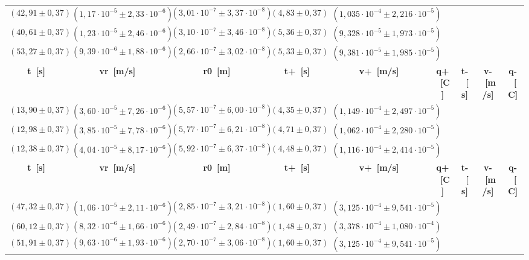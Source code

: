 \documentclass{article}
\begin{document}
\begin{table}[H]
\begin{flushleft}
\begin{tabular}{|c|c|c|c|c|c|c|c|c|}
        \midrule
        \((42,91 \pm 0,37)\) & \((1,17 \cdot 10^{-5} \pm 2,33 \cdot 10^{-6})\) & \((3,01 \cdot 10^{-7} \pm 3,37 \cdot 10^{-8})\) & \((4,83 \pm 0,37)\) & \((1,035 \cdot 10^{-4} \pm 2,216 \cdot 10^{-5})\) \\
        \((40,61 \pm 0,37)\) & \((1,23 \cdot 10^{-5} \pm 2,46 \cdot 10^{-6})\) & \((3,10 \cdot 10^{-7} \pm 3,46 \cdot 10^{-8})\) & \((5,36 \pm 0,37)\) & \((9,328 \cdot 10^{-5} \pm 1,973 \cdot 10^{-5})\) \\
        \((53,27 \pm 0,37)\) & \((9,39 \cdot 10^{-6} \pm 1,88 \cdot 10^{-6})\) & \((2,66 \cdot 10^{-7} \pm 3,02 \cdot 10^{-8})\) & \((5,33 \pm 0,37)\) & \((9,381 \cdot 10^{-5} \pm 1,985 \cdot 10^{-5})\) \\
        \toprule
        \textbf{t~[s]} & \textbf{vr~[m/s]} & \textbf{r0~[m]} & \textbf{t+~[s]} & \textbf{v+~[m/s]} & \textbf{q+~[C]} & \textbf{t-~[s]} & \textbf{v-~[m/s]} & \textbf{q-~[C]} \\
        \midrule
        \((13,90 \pm 0,37)\) & \((3,60 \cdot 10^{-5} \pm 7,26 \cdot 10^{-6})\) & \((5,57 \cdot 10^{-7} \pm 6,00 \cdot 10^{-8})\) & \((4,35 \pm 0,37)\) & \((1,149 \cdot 10^{-4} \pm 2,497 \cdot 10^{-5})\) \\
        \((12,98 \pm 0,37)\) & \((3,85 \cdot 10^{-5} \pm 7,78 \cdot 10^{-6})\) & \((5,77 \cdot 10^{-7} \pm 6,21 \cdot 10^{-8})\) & \((4,71 \pm 0,37)\) & \((1,062 \cdot 10^{-4} \pm 2,280 \cdot 10^{-5})\) \\
        \((12,38 \pm 0,37)\) & \((4,04 \cdot 10^{-5} \pm 8,17 \cdot 10^{-6})\) & \((5,92 \cdot 10^{-7} \pm 6,37 \cdot 10^{-8})\) & \((4,48 \pm 0,37)\) & \((1,116 \cdot 10^{-4} \pm 2,414 \cdot 10^{-5})\) \\
        \toprule
        \textbf{t~[s]} & \textbf{vr~[m/s]} & \textbf{r0~[m]} & \textbf{t+~[s]} & \textbf{v+~[m/s]} & \textbf{q+~[C]} & \textbf{t-~[s]} & \textbf{v-~[m/s]} & \textbf{q-~[C]} \\
        \midrule
        \((47,32 \pm 0,37)\) & \((1,06 \cdot 10^{-5} \pm 2,11 \cdot 10^{-6})\) & \((2,85 \cdot 10^{-7} \pm 3,21 \cdot 10^{-8})\) & \((1,60 \pm 0,37)\) & \((3,125 \cdot 10^{-4} \pm 9,541 \cdot 10^{-5})\) \\
        \((60,12 \pm 0,37)\) & \((8,32 \cdot 10^{-6} \pm 1,66 \cdot 10^{-6})\) & \((2,49 \cdot 10^{-7} \pm 2,84 \cdot 10^{-8})\) & \((1,48 \pm 0,37)\) & \((3,378 \cdot 10^{-4} \pm 1,080 \cdot 10^{-4})\) \\
        \((51,91 \pm 0,37)\) & \((9,63 \cdot 10^{-6} \pm 1,93 \cdot 10^{-6})\) & \((2,70 \cdot 10^{-7} \pm 3,06 \cdot 10^{-8})\) & \((1,60 \pm 0,37)\) & \((3,125 \cdot 10^{-4} \pm 9,541 \cdot 10^{-5})\) \\

\end{tabular}
\end{flushleft}
\end{table}
\end{document}
